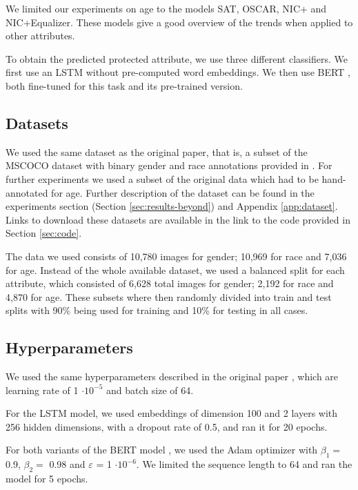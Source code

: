 We limited our experiments on age to the models SAT, OSCAR, NIC+ and NIC+Equalizer. These models give a good overview of the trends when applied to other attributes.

To obtain the predicted protected attribute, we use three different classifiers. We first use an LSTM  \cite{LSTM} without pre-computed word embeddings. We then use BERT \cite{BERT}, both fine-tuned for this task and its pre-trained version.

\subsection{Datasets}
\label{sec:datasets}

We used the same dataset as the original paper, that is, a subset of the MSCOCO dataset \cite{MSCOCO} with binary gender and race annotations provided in \cite{zhao2021captionbias}. For further experiments we used a subset of the original data which had to be hand-annotated for age. Further description of the dataset can be found in the experiments section (Section \ref{sec:results-beyond}) and Appendix \ref{app:dataset}. Links to download these datasets are available in the link to the code provided in Section \ref{sec:code}.

The data we used consists of 10,780 images for gender; 10,969 for race and 7,036 for age. Instead of the whole available dataset, we used a balanced split for each attribute, which consisted of 6,628 total images for gender; 2,192 for race and 4,870 for age. These subsets where then randomly divided into train and test splits with 90\% being used for training and 10\% for testing in all cases.

\subsection{Hyperparameters}

We used the same hyperparameters described in the original paper \cite{Hirota2022}, which are learning rate of 1 $\cdot 10^{-5}$ and batch size of 64. \par

For the LSTM model, we used embeddings of dimension 100 and 2 layers with 256 hidden dimensions, with a dropout rate of 0.5, and ran it for 20 epochs. \par 

For both variants of the BERT model \cite{BERT}, we used the Adam optimizer with $\beta_1 = $0.9, $\beta_2 =$ 0.98 and $\varepsilon$ = 1 $\cdot 10^{-6}$. We limited the sequence length to 64 and ran the model for 5 epochs.

